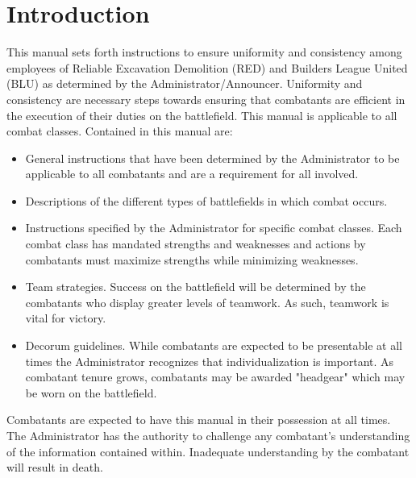 \section{Introduction}
\label{Introduction}
This manual sets forth instructions to ensure uniformity and consistency among employees of Reliable Excavation Demolition (RED) and Builders League United (BLU) as determined by the Administrator/Announcer.  Uniformity and consistency are necessary steps towards ensuring that combatants are efficient in the execution of their duties on the battlefield. This manual is applicable to all combat classes.  Contained in this manual are:

 \begin{itemize}

\item General instructions that have been determined by the Administrator to be applicable to all combatants and are a requirement for all involved.
\item Descriptions of the different types of battlefields in which combat occurs.  
\item Instructions specified by the Administrator for specific combat classes.  Each combat class has mandated strengths and weaknesses and actions by combatants must maximize strengths while minimizing weaknesses.  
\item Team strategies.  Success on the battlefield will be determined by the combatants who display greater levels of teamwork.  As such, teamwork is vital for victory. 
\item Decorum guidelines.  While combatants are expected to be presentable at all times the Administrator recognizes that individualization is important. As combatant tenure grows, combatants may be awarded "headgear" which may be worn on the battlefield.
\end{itemize}
Combatants are expected to have this manual in their possession at all times. The Administrator has the authority to challenge any combatant's understanding of the information contained within. Inadequate understanding by the combatant will result in death.